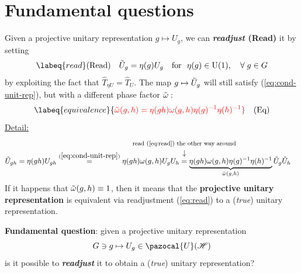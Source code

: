 \documentclass[../main.tex]{subfiles}
\begin{document}
\section{Fundamental questions}
Given a projective unitary representation $g\mapsto U_g$, we can \textbf{\textit{readjust} (Read)} it by setting
\begin{equation}\labeq{read}
(\textrm{Read})\quad \Tilde{U}_g=\eta(g)U_g \quad \textrm{for } \ \eta(g)\in\textrm{U}(1), \quad \forall\;g\in G
\end{equation}
by exploiting the fact that $\hat{T}_{\eta U}=\hat{T}_U$. The map $g\mapsto\Tilde{U}_g$ will still satisfy (\ref{eq:cond-unit-rep}), but with a different phase factor $\Tilde{\omega}:$
\begin{equation}\labeq{equivalence}
{\color{red}\Tilde{\omega}(g,h)=\eta(gh)\omega(g,h)\eta(g)^{-1}\eta(h)^{-1}} \quad (\textrm{Eq})
\end{equation}
\underline{Detail:} 
\[
\begin{split}
\Tilde{U}_{gh}&=\eta(gh)U_{gh}\overset{(\ref{eq:cond-unit-rep})}{=}\eta(gh)\omega(g,h)U_gU_h\overset{\mathclap{\tikz \node {$\downarrow$} node [above=1.25ex] {\footnotesize read (\ref{eq:read}) the other way around};}}{=}\underbrace{\eta(gh)\omega(g,h)\eta(g)^{-1}\eta(h)^{-1}}_{\Tilde{\omega}(g,h)}\Tilde{U}_g\Tilde{U}_h
\end{split}
\]
If it happens that $\Tilde{\omega}(g,h)\equiv 1$, then it means that the \textbf{projective unitary representation} is equivalent via readjustment (\ref{eq:read}) to a (\textit{true}) unitary representation.

\textbf{Fundamental question}: given a projective unitary representation
\[
G\ni g \mapsto U_g\in\pazocal{U}(\mathcal{H})
\]
is it possible to \textit{\textbf{readjust}} it to obtain a (\textit{true}) unitary representation?
\end{document}
